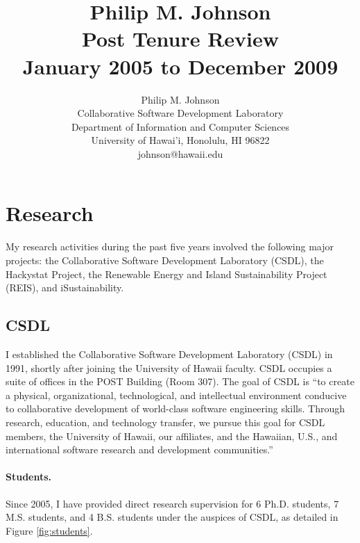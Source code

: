 \documentclass[11pt]{article}
\begin{document}
\title{{\bf Philip M. Johnson \\ 
       Post Tenure Review \\ 
       January 2005 to December 2009}}

\author{Philip M. Johnson \\
      Collaborative Software Development Laboratory \\
      Department of Information and Computer Sciences \\
      University of Hawai'i,  Honolulu, HI 96822 \\
      johnson@hawaii.edu 
}

\maketitle



\section{Research}

My research activities during the past five years involved the following
major projects: the Collaborative Software Development Laboratory (CSDL),
the Hackystat Project, the Renewable Energy and Island Sustainability
Project (REIS), and iSustainability.

\subsection{CSDL}

I established the Collaborative Software Development Laboratory (CSDL) in 1991, shortly after joining the University of Hawaii faculty.  CSDL occupies a suite of offices in the POST Building (Room 307). The goal of CSDL is ``to create a physical, organizational, technological, and intellectual environment conducive to collaborative development of world-class software engineering skills. Through research, education, and technology transfer, we pursue this goal for CSDL members, the University of Hawaii, our affiliates, and the Hawaiian, U.S., and international software research and development communities.''

\paragraph{Students.} Since 2005, I have provided direct research supervision for 6 Ph.D. students, 7 M.S. students, and 4 B.S. students under the auspices of CSDL, as detailed in Figure \ref{fig:students}.
\end{document}
